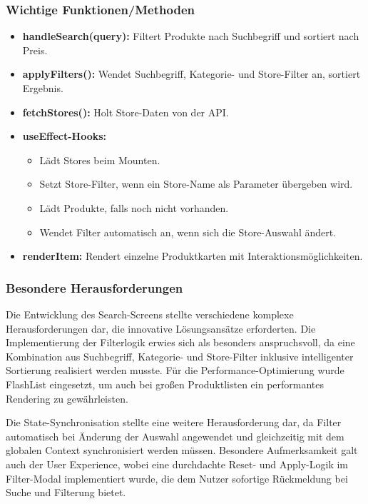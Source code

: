 \subsubsection{Wichtige Funktionen/Methoden}
\begin{itemize}
    \item \textbf{handleSearch(query):} Filtert Produkte nach Suchbegriff und sortiert nach Preis.
    \item \textbf{applyFilters():} Wendet Suchbegriff, Kategorie- und Store-Filter an, sortiert Ergebnis.
    \item \textbf{fetchStores():} Holt Store-Daten von der API.
    \item \textbf{useEffect-Hooks:}
    \begin{itemize}
        \item Lädt Stores beim Mounten.
        \item Setzt Store-Filter, wenn ein Store-Name als Parameter übergeben wird.
        \item Lädt Produkte, falls noch nicht vorhanden.
        \item Wendet Filter automatisch an, wenn sich die Store-Auswahl ändert.
    \end{itemize}
    \item \textbf{renderItem:} Rendert einzelne Produktkarten mit Interaktionsmöglichkeiten.
\end{itemize}

\subsubsection{Besondere Herausforderungen}
Die Entwicklung des Search-Screens stellte verschiedene komplexe Herausforderungen dar, die innovative Lösungsansätze erforderten. Die Implementierung der Filterlogik erwies sich als besonders anspruchsvoll, da eine Kombination aus Suchbegriff, Kategorie- und Store-Filter inklusive intelligenter Sortierung realisiert werden musste. Für die Performance-Optimierung wurde FlashList eingesetzt, um auch bei großen Produktlisten ein performantes Rendering zu gewährleisten.

Die State-Synchronisation stellte eine weitere Herausforderung dar, da Filter automatisch bei Änderung der Auswahl angewendet und gleichzeitig mit dem globalen Context synchronisiert werden müssen. Besondere Aufmerksamkeit galt auch der User Experience, wobei eine durchdachte Reset- und Apply-Logik im Filter-Modal implementiert wurde, die dem Nutzer sofortige Rückmeldung bei Suche und Filterung bietet.

